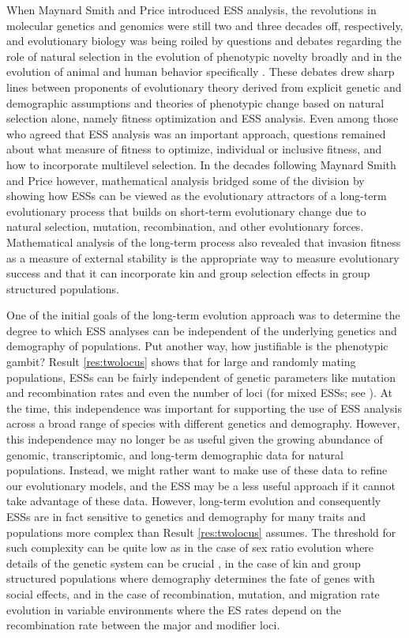 \documentclass[11pt]{article}
\begin{document}
When Maynard Smith and Price \cite{Maynard-Smith:Price:1973,Maynard-Smith:1974} introduced ESS analysis, the revolutions in molecular genetics and genomics were still two and three decades off, respectively, and evolutionary biology was being roiled by questions and debates regarding the role of natural selection in the evolution of phenotypic novelty broadly \cite{Gould:Lewontin:1979} and in the evolution of animal and human behavior specifically \cite{Lewontin:1977,Hamilton:1977}. These debates drew sharp lines between proponents of evolutionary theory derived from explicit genetic and demographic assumptions and theories of phenotypic change based on natural selection alone, namely fitness optimization and ESS analysis. Even among those who agreed that ESS analysis was an important approach, questions remained about what measure of fitness to optimize, individual or inclusive fitness, and how to incorporate multilevel selection. In the decades following Maynard Smith and Price \cite{Maynard-Smith:Price:1973} however, mathematical analysis bridged some of the division by showing how ESSs can be viewed as the evolutionary attractors of a long-term evolutionary process that builds on short-term evolutionary change due to natural selection, mutation, recombination, and other evolutionary forces. Mathematical analysis of the long-term process also revealed that invasion fitness as a measure of external stability is the appropriate way to measure evolutionary success and that it can incorporate kin and group selection effects in group structured populations.

One of the initial goals of the long-term evolution approach was to determine the degree to which ESS analyses can be independent of the underlying genetics and demography of populations. Put another way, how justifiable is the phenotypic gambit? Result \ref{res:twolocus} shows that for large and randomly mating populations, ESSs can be fairly independent of genetic parameters like mutation and recombination rates and even the number of loci (for mixed ESSs; see \cite{Eshel:Feldman:1998,Eshel:Feldman:2001}). At the time, this independence was important for supporting the use of ESS analysis across a broad range of species with different genetics and demography. However, this independence may no longer be as useful given the growing abundance of genomic, transcriptomic, and long-term demographic data for natural populations. Instead, we might rather want to make use of these data to refine our evolutionary models, and the ESS may be a less useful approach if it cannot take advantage of these data. However, long-term evolution and consequently ESSs are in fact sensitive to genetics and demography for many traits and populations more complex than Result \ref{res:twolocus} assumes. The threshold for such complexity can be quite low as in the case of sex ratio evolution where details of the genetic system can be crucial \cite{Hamilton:1967,Eshel:Feldman:1982a,Wu:1983,Taylor:Jaenike:2002}, in the case of kin and group structured populations where demography determines the fate of genes with social effects, and in the case of recombination, mutation, and migration rate evolution in variable environments where the ES rates depend on the recombination rate between the major and modifier loci.
\end{document}
